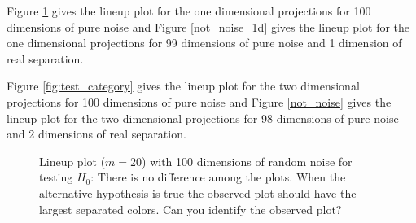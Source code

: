 \documentclass[12]{report}
\begin{document}
Figure \ref{fig:test_category_1d} gives the lineup plot for the one dimensional projections for 100 dimensions of pure noise and Figure \ref{not_noise_1d} gives the lineup plot for the one dimensional projections for 99 dimensions of pure noise and 1 dimension of real separation.

Figure \ref{fig:test_category} gives the lineup plot for the two dimensional projections for 100 dimensions of pure noise and Figure \ref{not_noise} gives the lineup plot for the two dimensional projections for 98 dimensions of pure noise and 2 dimensions of real separation.


\begin{figure}[hbtp]
   \centering
       \caption{Lineup plot ($m=20$) with 100 dimensions of random noise for testing $H_0$: There is no difference among the plots. When the alternative hypothesis is true the observed plot should have the largest separated colors. Can you identify the observed plot?}
     \label{fig:test_category_1d}
\end{figure}
\end{document}
